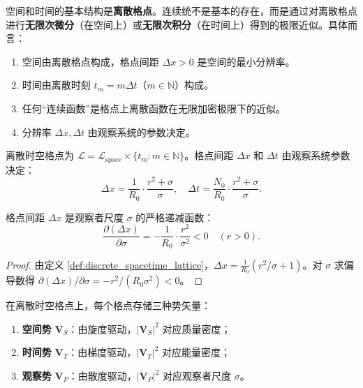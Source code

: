 \begin{axiom}[离散性本原公理]\label{axm:discreteness}
空间和时间的基本结构是\textbf{离散格点}。连续统不是基本的存在，而是通过对离散格点进行\textbf{无限次微分}（在空间上）或\textbf{无限次积分}（在时间上）得到的极限近似。具体而言：
\begin{enumerate}[label=(\roman*)]
    \item 空间由离散格点构成，格点间距 $\Delta x>0$ 是空间的最小分辨率。
    \item 时间由离散时刻 $t_m=m\Delta t$（$m\in\mathbb{N}$）构成。
    \item 任何“连续函数”是格点上离散函数在无限加密极限下的近似。
    \item 分辨率 $\Delta x,\Delta t$ 由观察系统的参数决定。
\end{enumerate}
\end{axiom}

\begin{definition}[离散时空格点]\label{def:discrete_spacetime_lattice}
离散时空格点为 $\mathcal{L}=\mathcal{L}_{\text{space}}\times\{t_m:m\in\mathbb{N}\}$。格点间距 $\Delta x$ 和 $\Delta t$ 由观察系统参数决定：
\[
\Delta x=\frac{1}{R_0}\cdot\frac{r^2+\sigma}{\sigma},\quad \Delta t=\frac{N_0}{R_0}\cdot\frac{r^2+\sigma}{\sigma}.
\]
\end{definition}

\begin{proposition}[格点间距与观察者尺度的关系]\label{prop:lattice_spacing_observer}
格点间距 $\Delta x$ 是观察者尺度 $\sigma$ 的严格递减函数：
\[
\frac{\partial(\Delta x)}{\partial\sigma}=-\frac{1}{R_0}\cdot\frac{r^2}{\sigma^2}<0\quad(r>0).
\]
\end{proposition}

\begin{proof}
由定义 \ref{def:discrete_spacetime_lattice}，$\Delta x=\frac{1}{R_0}(r^2/\sigma+1)$。对 $\sigma$ 求偏导数得 $\partial(\Delta x)/\partial\sigma=-r^2/(R_0\sigma^2)<0$。
\end{proof}

\begin{definition}[三种势矢量]\label{def:three_potential_vectors}
在离散时空格点上，每个格点存储三种势矢量：
\begin{enumerate}[label=(\roman*)]
    \item \textbf{空间势} $\mathbf{V}_S$：由旋度驱动，$|\mathbf{V}_S|^2$ 对应质量密度；
    \item \textbf{时间势} $\mathbf{V}_T$：由梯度驱动，$|\mathbf{V}_T|^2$ 对应能量密度；
    \item \textbf{观察势} $\mathbf{V}_P$：由散度驱动，$|\mathbf{V}_P|^2$ 对应观察者尺度 $\sigma$。
\end{enumerate}
\end{definition}

